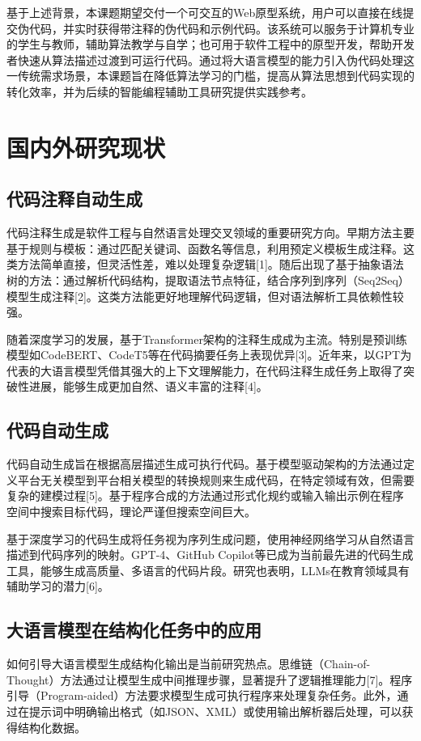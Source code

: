 \documentclass[twoside,openright]{xduugthesis}
\begin{document}
基于上述背景，本课题期望交付一个可交互的Web原型系统，用户可以直接在线提交伪代码，并实时获得带注释的伪代码和示例代码。该系统可以服务于计算机专业的学生与教师，辅助算法教学与自学；也可用于软件工程中的原型开发，帮助开发者快速从算法描述过渡到可运行代码。通过将大语言模型的能力引入伪代码处理这一传统需求场景，本课题旨在降低算法学习的门槛，提高从算法思想到代码实现的转化效率，并为后续的智能编程辅助工具研究提供实践参考。

\section{国内外研究现状}
\subsection{代码注释自动生成}
代码注释生成是软件工程与自然语言处理交叉领域的重要研究方向。早期方法主要基于规则与模板：通过匹配关键词、函数名等信息，利用预定义模板生成注释。这类方法简单直接，但灵活性差，难以处理复杂逻辑[1]。随后出现了基于抽象语法树的方法：通过解析代码结构，提取语法节点特征，结合序列到序列（Seq2Seq）模型生成注释[2]。这类方法能更好地理解代码逻辑，但对语法解析工具依赖性较强。

随着深度学习的发展，基于Transformer架构的注释生成成为主流。特别是预训练模型如CodeBERT、CodeT5等在代码摘要任务上表现优异[3]。近年来，以GPT为代表的大语言模型凭借其强大的上下文理解能力，在代码注释生成任务上取得了突破性进展，能够生成更加自然、语义丰富的注释[4]。
\subsection{代码自动生成}
代码自动生成旨在根据高层描述生成可执行代码。基于模型驱动架构的方法通过定义平台无关模型到平台相关模型的转换规则来生成代码，在特定领域有效，但需要复杂的建模过程[5]。基于程序合成的方法通过形式化规约或输入输出示例在程序空间中搜索目标代码，理论严谨但搜索空间巨大。

基于深度学习的代码生成将任务视为序列生成问题，使用神经网络学习从自然语言描述到代码序列的映射。GPT-4、GitHub Copilot等已成为当前最先进的代码生成工具，能够生成高质量、多语言的代码片段。研究也表明，LLMs在教育领域具有辅助学习的潜力[6]。
\subsection{大语言模型在结构化任务中的应用}
如何引导大语言模型生成结构化输出是当前研究热点。思维链（Chain-of-Thought）方法通过让模型生成中间推理步骤，显著提升了逻辑推理能力[7]。程序引导（Program-aided）方法要求模型生成可执行程序来处理复杂任务。此外，通过在提示词中明确输出格式（如JSON、XML）或使用输出解析器后处理，可以获得结构化数据。
\end{document}
